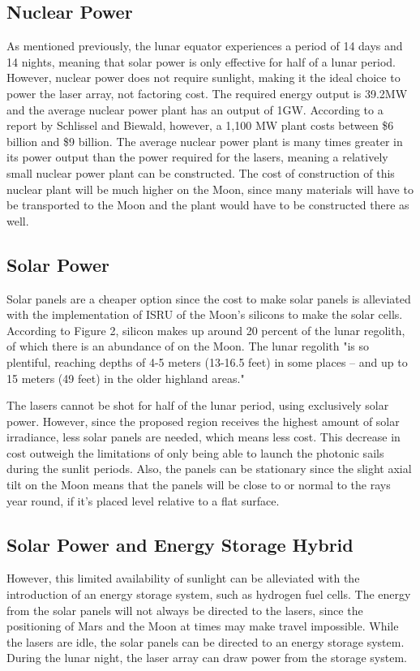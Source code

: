 \documentclass{aa}
\begin{document}
\subsection{Nuclear Power}
As mentioned previously, the lunar equator experiences a period of 14 days and 14 nights, meaning that solar power is only effective for half of a lunar period. However, nuclear power does not require sunlight, making it the ideal choice to power the laser array, not factoring cost. The required energy output is 39.2MW and the average nuclear power plant has an output of 1GW. According to a report by Schlissel and Biewald, however,  a 1,100 MW plant costs between \$6 billion and \$9 billion. The average nuclear power plant is many times greater in its power output than the power required for the lasers, meaning a relatively small nuclear power plant can be constructed. The cost of construction of this nuclear plant will be much higher on the Moon, since many materials will have to be transported to the Moon and the plant would have to be constructed there as well.
 \subsection{Solar Power}
Solar panels are a cheaper option since the cost to make solar panels is alleviated with the implementation of ISRU of the Moon's silicons to make the solar cells. According to Figure 2, silicon makes up around 20 percent of the lunar regolith, of which there is an abundance of on the Moon. The lunar regolith "is so plentiful, reaching depths of 4-5 meters (13-16.5 feet) in some places – and up to 15 meters (49 feet) in the older highland areas." 
	
    The lasers cannot be shot for half of the lunar period, using exclusively solar power. However, since the proposed region receives the highest amount of solar irradiance, less solar panels are needed, which means less cost. This decrease in cost outweigh the limitations of only being able to launch the photonic sails during the sunlit periods. Also, the panels can be stationary since the slight axial tilt on the Moon means that the panels will be close to or normal to the rays year round, if it's placed level relative to a flat surface.
\subsection{Solar Power and Energy Storage Hybrid}    
    However, this limited availability of sunlight can be alleviated with the introduction of an energy storage system, such as hydrogen fuel cells. The energy from the solar panels will not always be directed to the lasers, since the positioning of Mars and the Moon at times may make travel impossible. While the lasers are idle, the solar panels can be directed to an energy storage system. During the lunar night, the laser array can draw power from the storage system.
    
\end{document}
